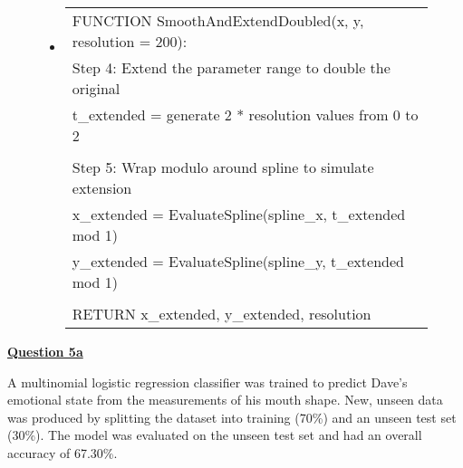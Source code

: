 \documentclass[12pt]{article}
\begin{document}
{\begin{figure}[H]
{\begin{minipage}[t]{0.5\textwidth}
{\begin{minipage}[t]{\textwidth}
\begin{itemize}
           \item[] %
{\footnotesize
\begin{adjustwidth}{-0.9cm}{}
\begin{tabular}{|l|}
\hline
\ttfamily
FUNCTION SmoothAndExtendDoubled(x, y, resolution = 200): \\
\hspace{1em}Step 4: Extend the parameter range to double the original \\
\hspace{1em}t\_extended = generate 2 * resolution values from 0 to 2 \\
\\
\hspace{1em}Step 5: Wrap modulo around spline to simulate extension \\
\hspace{1em}x\_extended = EvaluateSpline(spline\_x, t\_extended mod 1) \\
\hspace{1em}y\_extended = EvaluateSpline(spline\_y, t\_extended mod 1) \\
\\
\hspace{1em}RETURN x\_extended, y\_extended, resolution \\
\hline
\end{tabular}
\end{adjustwidth}
}        \end{itemize}
    \end{minipage}
    }
\end{minipage}
} %

\end{figure}
}



\noindent\textbf{\underline{Question 5a}}\par
\noindent A multinomial logistic regression classifier was trained to predict Dave's emotional state from the measurements of his mouth shape. New, unseen data was produced by splitting the dataset into training (70\%) and an unseen test set (30\%). The model was evaluated on the unseen test set and had an overall accuracy of 67.30\%.
\end{document}
